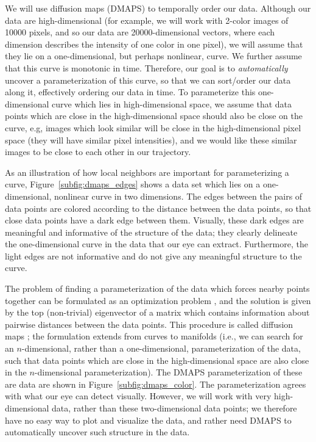 \documentclass{pnastwo}
\begin{document}
\begin{article}
We will use diffusion maps (DMAPS) \cite{coifman2005geometric} to temporally order our data.
%
Although our data are high-dimensional (for example, we will work with 2-color images of 10000 pixels, and so our data are 20000-dimensional vectors, where each dimension describes the intensity of one color in one pixel), we will assume that they lie on a one-dimensional, but perhaps nonlinear, curve.
%
We further assume that this curve is monotonic in time.
%
Therefore, our goal is to {\em automatically} uncover a parameterization of this curve, so that we can sort/order our data along it, effectively ordering our data in time.
%
To parameterize this one-dimensional curve which lies in high-dimensional space, we assume that data points which are close in the high-dimensional space should also be close on the curve, 
e.g, images which look similar will be close in the high-dimensional pixel space (they will have similar pixel intensities), and we would like these similar images to be close to each other in our trajectory.
%

As an illustration of how local neighbors are important for parameterizing a curve, Figure~\ref{subfig:dmaps_edges} shows a data set which lies on a one-dimensional, nonlinear curve in two dimensions.
%
The edges between the pairs of data points are colored according to the distance between the data points, so that close data points have a dark edge between them.
%
Visually, these dark edges are meaningful and informative of the structure of the data; they clearly delineate the one-dimensional curve in the data that our eye can extract.
%
Furthermore, the light edges are not informative and do not give any meaningful structure to the curve. 

The problem of finding a parameterization of the data which forces nearby points together can be formulated as an optimization problem \cite{Belkin2003}, and the solution is given by the top (non-trivial) eigenvector of a matrix which contains information about pairwise distances between the data points. 
%
This procedure is called diffusion maps \cite{coifman2005geometric}; the formulation extends from curves to manifolds (i.e., we can search for an $n$-dimensional, rather than a one-dimensional, parameterization of the data, such that data points which are close in the high-dimensional space are also close in the $n$-dimensional parameterization). 
%
The DMAPS parameterization of these are data are shown in Figure~\ref{subfig:dmaps_color}.
%
The parameterization agrees with what our eye can detect visually.
%
However, we will work with very high-dimensional data, rather than these two-dimensional data points; we therefore have no easy way to plot and visualize the data, and rather need DMAPS to automatically uncover such structure in the data.


\end{article}
\end{document}
